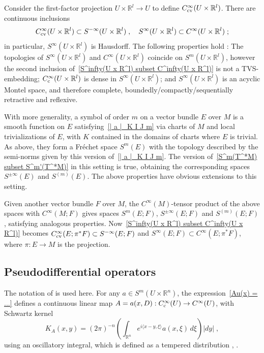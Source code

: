 \documentclass{memo-l}
\theoremstyle{plain}
\theoremstyle{definition}
\theoremstyle{remark}
\newcommand{\R}{\mathbb{R}}
\newcommand{\Cinftyc}{C^\infty_{\text{\rm c}}}
\newcommand{\Cinftycv}{C^\infty_{\text{\rm cv}}}
\numberwithin{section}{chapter}
\numberwithin{equation}{section}%
\begin{document}
Consider the first-factor projection $U\times\R^l\to U$ to define $\Cinftycv(U\times\R^l)$. There are continuous inclusions
\begin{equation}\label{S^infty(U x R^l) subset C^infty(U x R^l)}
\Cinftycv(U\times\R^l)\subset S^{-\infty}(U\times\R^l)\;,\quad S^\infty(U\times\R^l)\subset C^\infty(U\times\R^l)\;;
\end{equation}
in particular, $S^\infty(U\times\R^l)$ is Hausdorff. The following properties hold \cite[Corollaries~3.4--3.6 and Remark~3.8]{AlvKordyLeichtnam-conormal}: The topologies of $S^\infty(U\times\R^l)$ and $C^\infty(U\times\R^l)$ coincide on $S^m(U\times\R^l)$, however the second inclusion of~\eqref{S^infty(U x R^l) subset C^infty(U x R^l)} is not a TVS-embedding; $\Cinftyc(U\times\R^l)$ is dense in $S^\infty(U\times\R^l)$; and $S^\infty(U\times\R^l)$ is an acyclic Montel space, and therefore complete, boundedly/compactly/sequentially retractive and reflexive.

With more generality, a symbol of order $m$ on a vector bundle $E$ over $M$ is a smooth function on $E$ satisfying~\eqref{| a |_K I J m} via charts of $M$ and local trivializations of $E$, with $K$ contained in the domains of charts where $E$ is trivial. As above, they form a Fr\'echet space $S^m(E)$ with the topology described by the semi-norms given by this version of~\eqref{| a |_K I J m}. The version of~\eqref{S^m(T^*M) subset S^m'(T^*M)} in this setting is true, obtaining the corresponding spaces $S^{\pm\infty}(E)$ and $S^{(m)}(E)$. The above properties have obvious extensions to this setting.

Given another vector bundle $F$ over $M$, the $C^\infty(M)$-tensor product of the above spaces with $C^\infty(M;F)$ gives spaces $S^m(E;F)$, $S^{\pm\infty}(E;F)$ and $S^{(m)}(E;F)$, satisfying analogous properties. Now~\eqref{S^infty(U x R^l) subset C^infty(U x R^l)} becomes $\Cinftycv(E;\pi^*F)\subset S^{-\infty}(E;F)$ and $S^{\infty}(E;F)\subset C^\infty(E;\pi^*F)$, where $\pi:E\to M$ is the projection.



\subsection{Pseudodifferential operators}\label{ss: pseudodiff ops}

The notation of  is used here. For any $a\in S^m(U\times\R^n)$, the expression~\eqref{Au(x) = ...} defines a continuous linear map $A=a(x,D):\Cinftyc(U)\to C^\infty(U)$, with Schwartz kernel
\[
K_A(x,y)=(2\pi)^{-n}\left(\int_{\R^n}e^{i\langle x-y,\xi\rangle}a(x,\xi)\,d\xi\right)|dy|\;,
\]
using an oscillatory integral, which is defined as a tempered distribution \cite[Eq.~(4.2)]{Melrose1981}, \cite[Section~7.8]{Hormander1983-I}.
\end{document}
